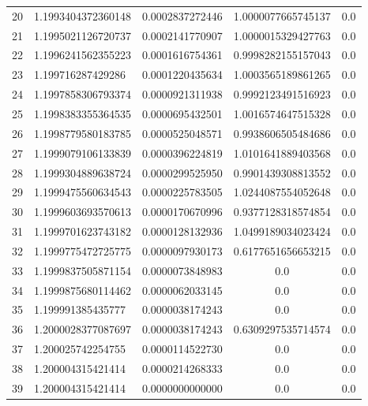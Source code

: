 \documentclass[titlepage,a4paper]{article}
\begin{document}
\begin{center}
\begin{tabular}{| c | l | c | c | c |}
20      & 1.1993404372360148  &  0.0002837272446  &  1.0000077665745137  &  0.0 \\
21      & 1.1995021126720737  &  0.0002141770907  &  1.0000015329427763  &  0.0 \\
22      & 1.1996241562355223  &  0.0001616754361  &  0.9998282155157043  &  0.0 \\
23      & 1.199716287429286  &  0.0001220435634  &  1.0003565189861265  &  0.0 \\
24      & 1.1997858306793374  &  0.0000921311938  &  0.9992123491516923  &  0.0 \\
25      & 1.1998383355364535  &  0.0000695432501  &  1.0016574647515328  &  0.0 \\
26      & 1.1998779580183785  &  0.0000525048571  &  0.9938606505484686  &  0.0 \\
27      & 1.1999079106133839  &  0.0000396224819  &  1.0101641889403568  &  0.0 \\
28      & 1.1999304889638724  &  0.0000299525950  &  0.9901439308813552  &  0.0 \\
29      & 1.1999475560634543  &  0.0000225783505  &  1.0244087554052648  &  0.0 \\
30      & 1.1999603693570613  &  0.0000170670996  &  0.9377128318574854  &  0.0 \\
31      & 1.1999701623743182  &  0.0000128132936  &  1.0499189034023424  &  0.0 \\
32      & 1.1999775472725775  &  0.0000097930173  &  0.6177651656653215  &  0.0 \\
33      & 1.1999837505871154  &  0.0000073848983  &  0.0  &  0.0 \\
34      & 1.1999875680114462  &  0.0000062033145  &  0.0  &  0.0 \\
35      & 1.199991385435777  &  0.0000038174243  &  0.0  &  0.0 \\
36      & 1.2000028377087697  &  0.0000038174243  &  0.6309297535714574  &  0.0 \\
37      & 1.200025742254755  &  0.0000114522730  &  0.0  &  0.0 \\
38      & 1.200004315421414  &  0.0000214268333  & 0.0 & 0.0 \\
39      & 1.200004315421414  &  0.0000000000000  & 0.0 & 0.0 \\
                \hline
        \end{tabular}
\end{center}
\end{document}
